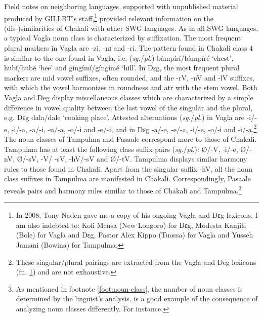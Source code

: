 \begin{exe}
\begin{exe}
\begin{exe}
{\begin{exe}
\begin{exe}
\begin{exe}
\begin{exe}
Field notes on neighboring languages, supported with unpublished
material produced
by GILLBT's staff,\footnote{\label{ft:GRM-naden-donate}In 2008, Tony Naden gave
me  a copy of his ongoing
Vagla and Dɛg lexicons. I am also 
indebted to: Kofi Mensa (New
Longoro) for Dɛg, Modesta
Kanjiti  (Bole) for Vagla and Dɛg, Pastor Alex Kippo (Tuossa) for Vagla and 
Yusseh Jamani (Bowina) for Tampulma.}  provided relevant information on
the
(dis-)similarities of Chakali with other SWG languages. As in all SWG languages,
a typical Vagla noun class is characterized by  suffixation.
The most frequent plural markers in Vagla are {\sls -zi}, {\sls -nɪ} and
{\sls -ri}. The pattern found in Chakali  class 4 is similar to the one found in
Vagla, i.e.
({\it sg.}/{\it pl.}) {\sls bàmpírí}/{\sls bàmpíré} `chest',  {\sls 
hūbí}/{\sls hūbé}  `bee' and   {\sls gíngímí}/{\sls gíngímé} `hill'.  
In 
Dɛg,   the most
frequent plural markers are mid vowel suffixes, often rounded,  and
the {\sls -rV}, {\sls -nV} and  {\sls -lV} suffixes, with which the vowel 
harmonizes
in
roundness and {\sc atr} with the stem vowel. Both Vagla and Deg display 
miscellaneous classes which are characterized by  a simple difference
in vowel quality between the last vowel of the singular and the plural, e.g. Dɛg
{\sls dala}/{\sls dale} `cooking place'. Attested
alternations  ({\it sg.}/{\it pl.}) in Vagla are {\sls -i}/{\sls -e},  {\sls 
-i}/{\sls -a},  {\sls -a}/{\sls -i}, 
{\sls -u}/{\sls -a},  {\sls -o}/{\sls -i} and  {\sls -e}/{\sls -i},   and in 
Dɛg {\sls 
-a}/{\sls -e}, {\sls -e}/{\sls -a}, {\sls -i}/{\sls -e}, {\sls -o}/{\sls -i} 
and  {\sls 
-i}/{\sls -a}.\footnote{These singular/plural pairings are extracted from the 
Vagla and
Deg lexicons (fn. \ref{ft:GRM-naden-donate}) and are not exhaustive.}  The noun
classes of Tampulma and Pasaale
correspond more to those of Chakali. Tampulma has at least
the
following class suffix pairs ({\it sg.}/{\it pl.}): {\sls \O}/{\sls -V}, {\sls 
-i}/{\sls -e}, {\sls \O}/{\sls -nV},  {\sls  \O}/{\sls -sV}, {\sls  -V}/{\sls 
-sV},  
{\sls -hV}/{\sls -sV} and  
{\sls \O}/{\sls -tV}.
Tampulma displays similar harmony rules to those found in Chakali. Apart from
the singular suffix {\sls -hV}, all the noun class suffixes in Tampulma are
manifested in Chakali.  Correspondingly, Pasaale reveals  pairs and
harmony rules similar to those of Chakali and Tampulma.\footnote{As mentioned in
footnote
\ref{foot:noun-class}, the number of noun classes is determined by the
linguist's analysis.  \citet[5--12]{Mcgi99} is a good example of 
the consequence of analyzing noun classes differently. For instance,  
}
\end{exe}
\end{exe}
\end{exe}
\end{exe}}
\end{exe}
\end{exe}
\end{exe}
